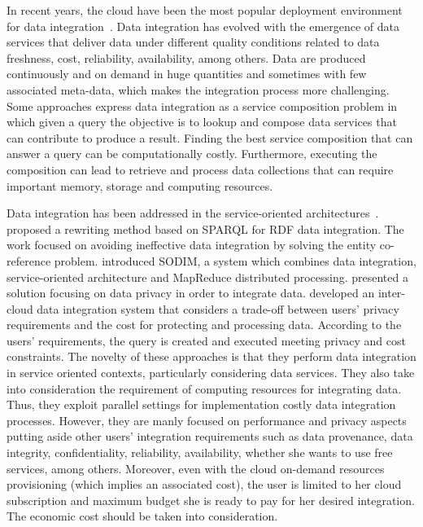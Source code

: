 In recent years, the cloud have been the most popular deployment environment for data integration~\cite{Carvalho2015}.
Data integration has evolved with the emergence of data services that deliver
data under different quality conditions related to data freshness, cost, reliability,
availability, among others. Data are produced continuously and on demand in huge
quantities and sometimes with few associated meta-data, which makes the
integration process more challenging. Some approaches express data integration
as a service composition problem in which given a query the objective is to lookup and compose data services that can contribute to produce a result. Finding the best service composition that can answer a query can be computationally costly. Furthermore,  executing the composition can lead to retrieve and process data collections that can require important memory, storage and computing resources.

Data integration has been addressed in the service-oriented architectures~\cite{Correndo2010,ElSheikh2013,Tian2010,YauY08}. 
\cite{Correndo2010} proposed a rewriting method based on SPARQL for RDF data integration. The work focused on avoiding ineffective data integration by solving the entity co-reference problem. \cite{ElSheikh2013} introduced SODIM, a system which combines data integration, service-oriented architecture and MapReduce distributed processing. \cite{YauY08} presented a solution focusing on data privacy in order to integrate data. \cite{Tian2010} developed an inter-cloud data integration system that considers a trade-off between users' privacy requirements and the cost for protecting and processing data. According to the users' requirements, the query is created and executed meeting privacy and cost constraints. The novelty of these approaches is that they perform data integration in service oriented contexts, particularly considering data services. They also take into consideration the requirement of computing resources for integrating data. Thus, they exploit parallel settings for implementation costly data integration processes. However, they are manly focused on performance and privacy aspects putting aside other users' integration requirements such as data provenance, data integrity, confidentiality, reliability, availability, whether she wants to use free services, among others. Moreover, even with the cloud on-demand resources provisioning (which implies an  associated cost), the user is limited to her cloud subscription and maximum budget she is ready to pay for her desired integration. The economic cost should be taken into consideration.

